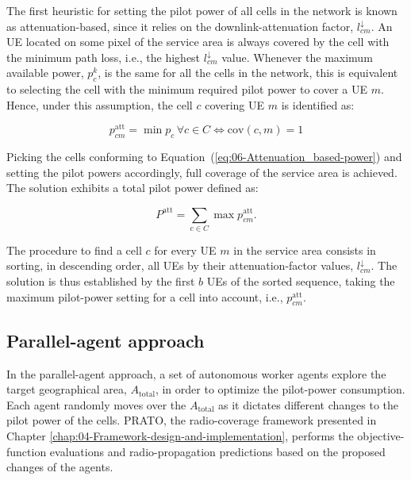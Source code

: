 The first heuristic for setting the pilot power of all cells in the
network is known as attenuation-based, since it relies on the downlink-attenuation
factor, $l_{cm}^{\downarrow}$. An UE located on some pixel of the
service area is always covered by the cell with the minimum path loss,
i.e., the highest $l{}_{cm}^{\downarrow}$ value. Whenever the maximum
available power, $p_{c}^{k}$, is the same for all the cells in the
network, this is equivalent to selecting the cell with the minimum
required pilot power to cover a UE $m$. Hence, under this assumption,
the cell $c$ covering UE $m$ is identified as:

\begin{equation}
p_{cm}^{\mathrm{att}}=\min p_{c}\,\forall c\in C\iff\mathrm{cov}(c,m)=1\label{eq:06-Attenuation_based-power}
\end{equation}


Picking the cells conforming to Equation~(\ref{eq:06-Attenuation_based-power})
and setting the pilot powers accordingly, full coverage of the service
area is achieved. The solution exhibits a total pilot power defined
as:

\begin{equation}
P^{\mathrm{att}}=\sum_{c\in C}\max p_{cm}^{\mathrm{att}}.
\end{equation}


The procedure to find a cell $c$ for every UE $m$ in the service
area consists in sorting, in descending order, all UEs by their attenuation-factor
values, $l_{cm}^{\downarrow}$. The solution is thus established by
the first $b$ UEs of the sorted sequence, taking the maximum pilot-power
setting for a cell into account, i.e., $p_{cm}^{\mathrm{att}}$.


\subsection{Parallel-agent approach \label{sub:06-Parallel_agent_approach}}

In the parallel-agent approach, a set of autonomous worker agents
explore the target geographical area, $A_{\mathrm{total}}$, in order
to optimize the pilot-power consumption. Each agent randomly moves
over the $A_{\mathrm{total}}$ as it dictates different changes to
the pilot power of the cells. PRATO, the radio-coverage framework
presented in Chapter \ref{chap:04-Framework-design-and-implementation},
performs the objective-function evaluations and radio-propagation
predictions based on the proposed changes of the agents.

